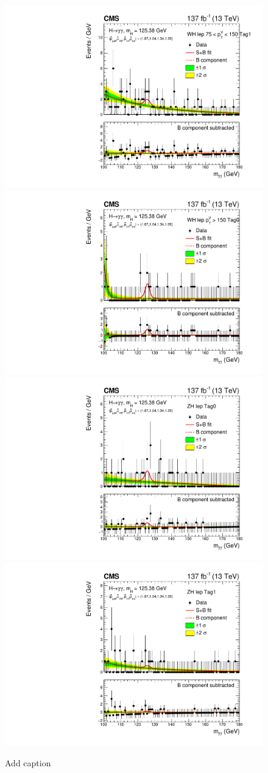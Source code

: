 \begin{figure}[htbp]
  \includegraphics[width=.32\linewidth]{Figures/app_sb_models/RECO_WH_LEP_PTV_75_150_Tag1_CMS_hgg_mass.pdf}
  \includegraphics[width=.32\linewidth]{Figures/app_sb_models/RECO_WH_LEP_PTV_GT150_Tag0_CMS_hgg_mass.pdf}
  \includegraphics[width=.32\linewidth]{Figures/app_sb_models/RECO_ZH_LEP_Tag0_CMS_hgg_mass.pdf}
  \includegraphics[width=.32\linewidth]{Figures/app_sb_models/RECO_ZH_LEP_Tag1_CMS_hgg_mass.pdf}
  \caption[Observed diphoton mass distributions]
  {
    Add caption
  }
  \label{fig:diphoton_mass_4}
\end{figure}

